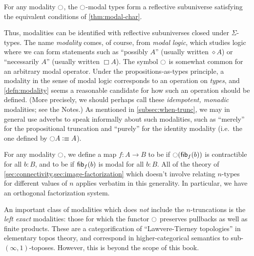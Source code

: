 \begin{cor}
  For any modality $\ocircle$, the $\ocircle$-modal types form a reflective subuniverse satisfying the equivalent conditions of \autoref{thm:modal-char}.
\end{cor}

Thus, modalities can be identified with reflective subuniverses closed under $\Sigma$-types.
The name \emph{modality} comes, of course, from \emph{modal logic}, which studies logic where we can form statements such as ``possibly $A$'' (usually written $\diamond A$) or ``necessarily $A$'' (usually written $\Box A$).
The symbol $\ocircle$ is somewhat common for an arbitrary modal operator. %
Under the propositions-as-types principle, a modality in the sense of modal logic corresponds to an operation on \emph{types}, and \autoref{defn:modality} seems a reasonable candidate for how such an operation should be defined.
(More precisely, we should perhaps call these \emph{idempotent, monadic} modalities; see the Notes.)
%
As mentioned in \autoref{subsec:when-trunc}, we may in general use adverbs to speak informally about such modalities, such as ``merely'' for the propositional truncation and ``purely'' for the identity modality
%
%
(i.e.\ the one defined by $\ocircle A \vcentcolon\equiv A$).

For any modality $\ocircle$, we define a map $f:A\to B$ to be 
%
%
if $\ocircle({\mathsf{fib}}_{f}(b))$ is contractible for all $b:B$, and to be 
%
%
if ${\mathsf{fib}}_{f}(b)$ is modal for all $b:B$.
All of the theory of \autoref{sec:connectivity,sec:image-factorization} which doesn't involve relating $n$-types for different values of $n$ applies verbatim in this generality.
%
%
In particular, we have an orthogonal factorization system.

An important class of modalities which does \emph{not} include the $n$-trun\-ca\-tions is the \emph{left exact} modalities: those for which the functor $\ocircle$ preserves pullbacks as well as finite products.
%
These are a categorification of ``Lawvere-Tierney topologies'' in elementary topos theory,
and correspond in higher-categorical semantics to sub-$(\infty,1)$-toposes.
%
However, this is beyond the scope of this book.


